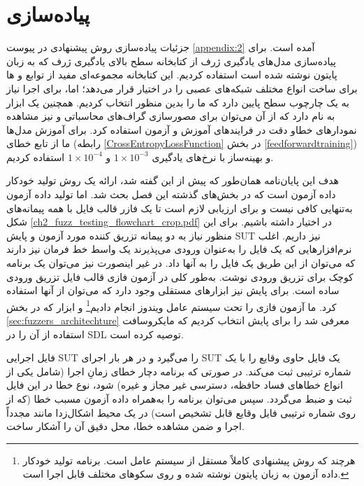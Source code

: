 


\section{پیاده‌سازی}\label{sec:implementation}

جزئیات پیاده‌سازی روش پیشنهادی در پیوست \ref{appendix:2} آمده است. برای پیاده‌سازی مدل‌های یادگیری ژرف از کتابخانه سطح بالای یادگیری ژرف 
\cite{chollet2015keras}  
که به زبان پایتون نوشته شده است استفاده کردیم. این کتابخانه مجموعه‌ای مفید از توابع و ها برای ساخت انواع مختلف شبکه‌های عصبی را در اختیار قرار می‌دهد؛ اما، برای اجرا نیاز به یک چارچوب سطح پایین دارد که ما   
\cite{DBLP:journals/corr/AbadiABBCCCDDDG16}
را بدین منظور انتخاب کردیم.  همچنین یک ابزار به نام  دارد که از آن می‌توان برای مصورسازی گراف‌های محاسباتی و نیز مشاهده نمودارهای خطاو دقت در فرایندهای آموزش و آزمون استفاده کرد. برای آموزش مدل‌ها ما از تابع خطای  (رابطه \ref{CrossEntropyLossFunction} در بخش \ref{feedforwardtraining}) و بهینه‌ساز  
\cite{DBLP:journals/corr/KingmaB14}
با نرخ‌های یادگیری 
$1 \times 10^{-3}$
و
$1 \times 10^{-4}$
استفاده کردیم.

هدف این پایان‌نامه همان‌طور که پیش از این گفته شد، ارائه یک روش تولید خودکار داده آزمون است که در بخش‌های گذشته این فصل بحث شد. اما تولید داده آزمون به‌تنهایی کافی نیست و برای ارزیابی لازم است تا یک فازر قالب فایل با همه پیمانه‌های شکل \ref{ch2_fuzz_testing_flowchart_crop.pdf} در اختیار داشته باشیم. برای این منظور نیاز به دو پیمانه تزریق کننده مورد آزمون و پایش \gls{SUT} نیز داریم. اغلب نرم‌افزارهایی که یک فایل را به‌عنوان ورودی می‌پذیرند یک واسط خط فرمان نیز دارند که می‌توان از این طریق یک فایل را به آنها داد. در غیر اینصورت نیز می‌توان یک برنامه کوچک برای تزریق ورودی نوشت. به‌طور کلی در آزمون فازی قالب فایل تزریق ورودی ساده است. برای پایش نیز ابزارهای مستقلی وجود دارد که می‌توان از آنها استفاده کرد. ما آزمون فازی را تحت سیستم عامل ویندوز انجام دادیم\footnote{هرچند که روش پیشنهادی کاملاً مستقل از سیستم عامل است. برنامه تولید خودکار داده آزمون به زبان پایتون نوشته شده و روی سکوهای مختلف قابل اجرا است.} و ابزار  
\cite{ApplicationVerifier}
که در بخش \ref{sec:fuzzers_architechture} معرفی شد را برای پایش انتخاب کردیم که مایکروسافت استفاده از آن را در \gls{SDL} توصیه کرده است.

فایل اجرایی \gls{SUT} را می‌گیرد و در هر بار اجرای \gls{SUT} یک فایل حاوی وقایع را با یک شماره ترتیبی ثبت می‌کند. در صورتی که برنامه دچار خطای زمانِ ‌اجرا (شامل یکی از انواع خطاهای فساد حافظه، دسترسی غیر مجاز و غیره) شود، نوع خطا در این فایل ثبت و ضبط می‌گردد. سپس می‌توان برنامه را به‌همراه داده آزمون مسبب خطا (که از روی شماره ترتیبی فایل وقایع قابل تشخیص است) در یک محیط اشکال‌زدا مانند  مجدداً اجرا و ضمن مشاهده خطا، محل دقیق آن را آشکار ساخت.

